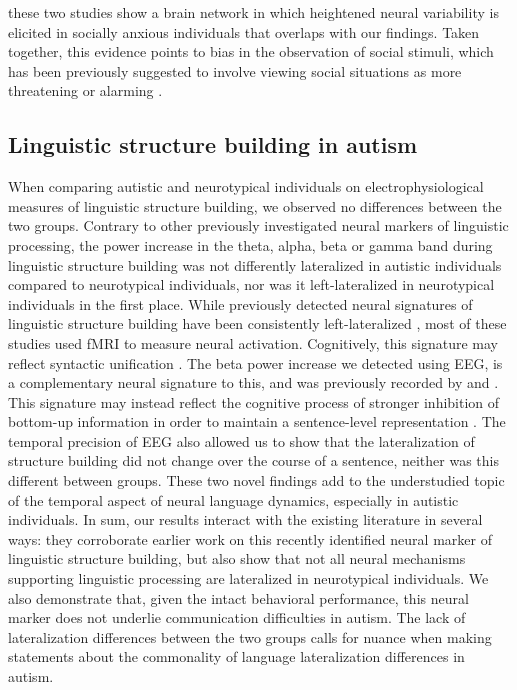 these two studies show a brain network in which heightened neural variability is elicited in socially anxious individuals that overlaps with our findings. Taken together, this evidence points to bias in the observation of social stimuli, which has been previously suggested to involve viewing social situations as more threatening or alarming \citep{rapee1997}.

\subsection{Linguistic structure building in autism}
When comparing autistic and neurotypical individuals on electrophysiological measures of linguistic structure building, we observed no differences between the two groups. Contrary to other previously investigated neural markers of linguistic processing, the power increase in the theta, alpha, beta or gamma band during linguistic structure building was not differently lateralized in autistic individuals compared to neurotypical individuals, nor was it left-lateralized in neurotypical individuals in the first place. While previously detected neural signatures of linguistic structure building have been consistently left-lateralized \citep{hagoort2017,giglio2022,fedorenko2010,friederici2003}, most of these studies used fMRI to measure neural activation. Cognitively, this signature may reflect syntactic unification \citep{hagoort2017}. The beta power increase we detected using EEG, is a complementary neural signature to this, and was previously recorded by \cite{bastiaansen2010} and \cite{bastiaansen2015}. This signature may instead reflect the cognitive process of stronger inhibition of bottom-up information in order to maintain a sentence-level representation \citep{miller2018,lewis2016}. The temporal precision of EEG also allowed us to show that the lateralization of structure building did not change over the course of a sentence, neither was this different between groups. These two novel findings add to the understudied topic of the temporal aspect of neural language dynamics, especially in autistic individuals. In sum, our results interact with the existing literature in several ways: they corroborate earlier work on this recently identified neural marker of linguistic structure building, but also show that not all neural mechanisms supporting linguistic processing are lateralized in neurotypical individuals. We also demonstrate that, given the intact behavioral performance, this neural marker does not underlie communication difficulties in autism. The lack of lateralization differences between the two groups calls for nuance when making statements about the commonality of language lateralization differences in autism.

